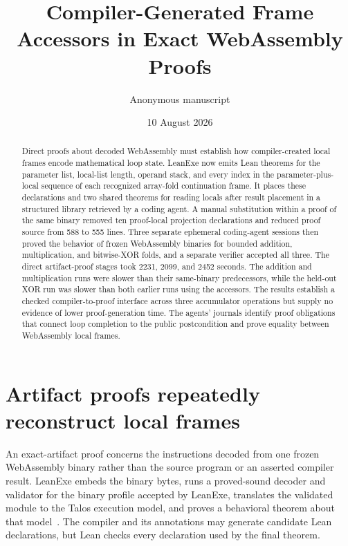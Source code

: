 \documentclass[10pt]{article}
\title{Compiler-Generated Frame Accessors in Exact WebAssembly Proofs}
\author{Anonymous manuscript}
\date{10 August 2026}
\begin{document}
\maketitle

\begin{abstract}
Direct proofs about decoded WebAssembly must establish how compiler-created local frames encode mathematical loop state.  LeanExe now emits Lean theorems for the parameter list, local-list length, operand stack, and every index in the parameter-plus-local sequence of each recognized array-fold continuation frame.  It places these declarations and two shared theorems for reading locals after result placement in a structured library retrieved by a coding agent.  A manual substitution within a proof of the same binary removed ten proof-local projection declarations and reduced proof source from 588 to 555 lines.  Three separate ephemeral coding-agent sessions then proved the behavior of frozen WebAssembly binaries for bounded addition, multiplication, and bitwise-XOR folds, and a separate verifier accepted all three.  The direct artifact-proof stages took 2231, 2099, and 2452 seconds.  The addition and multiplication runs were slower than their same-binary predecessors, while the held-out XOR run was slower than both earlier runs using the accessors.  The results establish a checked compiler-to-proof interface across three accumulator operations but supply no evidence of lower proof-generation time.  The agents' journals identify proof obligations that connect loop completion to the public postcondition and prove equality between WebAssembly local frames.
\end{abstract}

\section{Artifact proofs repeatedly reconstruct local frames}

An exact-artifact proof concerns the instructions decoded from one frozen WebAssembly binary rather than the source program or an asserted compiler result.  LeanExe embeds the binary bytes, runs a proved-sound decoder and validator for the binary profile accepted by LeanExe, translates the validated module to the Talos execution model, and proves a behavioral theorem about that model~\cite{Haas2017WebAssembly,Watt2018Mechanising,TalosSoftware,LeanExeSoftware}.  The compiler and its annotations may generate candidate Lean declarations, but Lean checks every declaration used by the final theorem.
\end{document}
